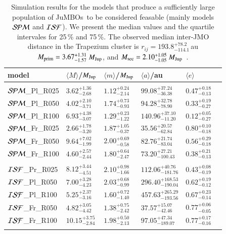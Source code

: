 \documentclass[submission,phys]{lib/SciPost}
\newcommand{\MJup}{\mbox{${M}_{\rm Jup}$}}
\newcommand{\jumbos}{\mbox{JuMBOs}}
\begin{document}
\begin{table}
  \caption{Simulation results for the models that produce a
    sufficiently large population of \jumbos\, to be considered
    feasable (mainly models ${\cal SPM}$ and ${\cal ISF}$). We present
    the median values and the quartile intervales for 25\,\% and
    75\,\%.  The observed median inter-JMO distance in the Trapezium
    cluster is $r_{ij} = 193.8^{+78.2}_{-114.1}$\,au $M_{\rm prim} =
    3.67^{+1.31}_{-1.57}$\,\MJup, and $M_{\rm sec} =
    2.10^{+1.05}_{-1.05}$\,\MJup\, \cite{2023arXiv231001231P}.  }
\label{Tab:orbital_distributions}
 \centering 
 \begin{tabular}{llllll}
 \hline\hline
model&$\langle M \rangle$/\MJup & $\langle m \rangle$/\MJup & $\langle a \rangle$/au & $\langle e \rangle$ \\
 \hline \vspace{-0.75em} \\ 
 ${\cal SPM}$\_Pl\_R025 & $3.62^{+1.36}_{-2.68}$ & $1.12^{+0.24}_{-2.14}$ & $99.08^{+37.24}_{-36.38}$ & $0.47^{+0.18}_{-0.13}$ \\
 ${\cal SPM}$\_Pl\_R050 & $4.02^{+2.10}_{-3.71}$ & $1.74^{+0.73}_{-0.93}$ & $94.28^{+32.78}_{-78.90}$ & $0.33^{+0.19}_{-0.27}$ \\  
 ${\cal SPM}$\_Pl\_R100 & $6.93^{+4.38}_{-3.07}$ & $1.29^{+0.23}_{-1.22}$ & $140.96^{+37.10}_{-11.20}$ & $0.12^{+0.05}_{-0.27}$ \\
 ${\cal SPM}$\_Fr\_R025 & $2.66^{+1.78}_{-3.20}$ & $1.87^{+1.05}_{-0.37}$ & $35.56^{+20.57}_{-62.84}$ & $0.80^{+0.10}_{-0.18}$ \\ 
 ${\cal SPM}$\_Fr\_R050 & $9.64^{+7.02}_{-1.99}$ & $2.00^{+0.69}_{-0.58}$ & $82.76^{+21.74}_{-83.04}$ & $0.56^{+0.29}_{-0.18}$ \\ 
 ${\cal SPM}$\_Fr\_R100 & $4.60^{+2.57}_{-2.44}$ & $1.80^{+0.64}_{-2.47}$ & $73.20^{+27.21}_{-100.43}$ & $0.38^{+0.21}_{-0.13}$ \\
 \hline \vspace{-0.75em} \\ 
 ${\cal ISF}$\_Pr\_R025 & $8.12^{+3.44}_{-4.51}$ & $2.10^{+0.98}_{-1.66}$ & $112.06^{+40.76}_{-181.76}$ & $0.43^{+0.08}_{-0.19}$ \\
 ${\cal ISF}$\_Pl\_R050 & $7.00^{+3.28}_{-4.23}$ & $2.03^{+0.68}_{-0.99}$ & $296.40^{+168.53}_{-190.04}$ & $0.62^{+0.19}_{-0.12}$ \\
 ${\cal ISF}$\_Pl\_R100 & $5.25^{+2.37}_{-3.16}$ & $1.60^{+0.72}_{-1.40}$ & $457.63^{+265.29}_{-193.56}$ & $0.67^{+0.23}_{-0.14}$ \\
 ${\cal ISF}$\_Fr\_R050 & $4.82^{+3.05}_{-4.42}$ & $1.38^{+0.75}_{-2.42}$ & $37.57^{+15.07}_{-42.46}$ & $0.77^{+0.06}_{-0.05}$ \\  
 ${\cal ISF}$\_Fr\_R100 &$10.15^{+3.75}_{-2.84}$ & $1.98^{+0.50}_{-2.13}$ & $97.05^{+47.34}_{-189.07}$ & $0.77^{+0.17}_{-0.16}$ \\
 \hline \vspace{-0.75em} \\ 
 \end{tabular}
\end{table}
\end{document}
